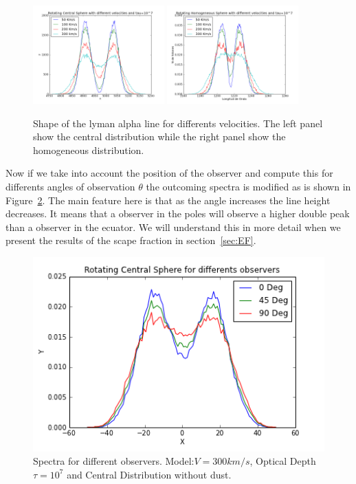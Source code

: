 \documentclass[usenatbib]{mn2e}
\begin{document}
\begin{figure}
  \includegraphics[width=0.45\textwidth]{7tDifSpeedsZ.png}
  \includegraphics[width=0.45\textwidth]{7tHOMDifSpeeds1.png}
  \label{fig:HOMandCentral}\caption{Shape of the lyman alpha line for
    differents velocities. The left panel show the central
    distribution while the right panel show the homogeneous
    distribution.}
\end{figure}


Now if we take into account the position of the observer and compute
this for differents angles of observation $\theta$ the outcoming
spectra is modified as is shown in Figure~\ref{DifferentObservers}. The main feature here is that as the angle increases the line height decreases. It means that a observer in the poles will observe a higher double peak than a
observer in the ecuator. We will understand this in more detail when
we present the results of the scape fraction in section~\ref{sec:EF}.      

\begin{figure}
\begin{center}
\includegraphics[scale=0.45]{Observers.png}
\end{center}
\caption{Spectra for different observers. Model:$V=300km/s$, Optical
  Depth $\tau=10^{7}$ and Central Distribution without dust.} 
  \label{DifferentObservers}
\end{figure}
\end{document}
